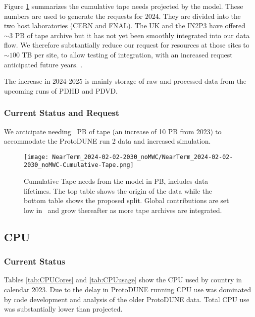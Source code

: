 \documentclass[12pt]{article}
\begin{document}
Figure  \ref{fig:Cumulative-Tape}  summarizes the cumulative  tape needs projected by  the model. These numbers are used to generate the requests for 2024.  They are divided into the two host laboratories (CERN and FNAL). The UK and the IN2P3 have offered $\sim 3$ PB of tape archive  but it has not yet been smoothly integrated into our data flow.  We  therefore substantially reduce our request for  resources  at those sites to $\sim 100$ TB per site, to allow testing of integration, with an increased request anticipated future years. .

The increase in 2024-2025 is mainly storage of raw and processed  data from the upcoming runs of PDHD and PDVD.



\subsubsection{Current Status and Request}\label{sec:taperesult}
 We anticipate needing \TAPETotal\ PB of tape (an increase of 10 PB from 2023) to accommodate the ProtoDUNE run 2 data and increased simulation. 


\begin{figure}[h]
\centering\texttt{[image: NearTerm\_2024-02-02-2030\_noMWC/NearTerm\_2024-02-02-2030\_noMWC-Cumulative-Tape.png]}

\caption{Cumulative Tape needs from the model in PB, includes data lifetimes.  The top table shows the origin of the data while the bottom table  shows the proposed split.  Global contributions are set low in \ThisYear\ and grow thereafter as more tape archives are integrated. }\label{fig:Cumulative-Tape}
\end{figure}



\clearpage
\subsection{CPU }

\subsubsection{Current Status}
Tables \ref{tab:CPUCores} and \ref{tab:CPUusage} show the CPU used by country  in calendar 2023.  Due to the delay in ProtoDUNE running CPU use was dominated by code development and analysis of the older ProtoDUNE data.   Total CPU use was substantially lower than projected.
\end{document}
